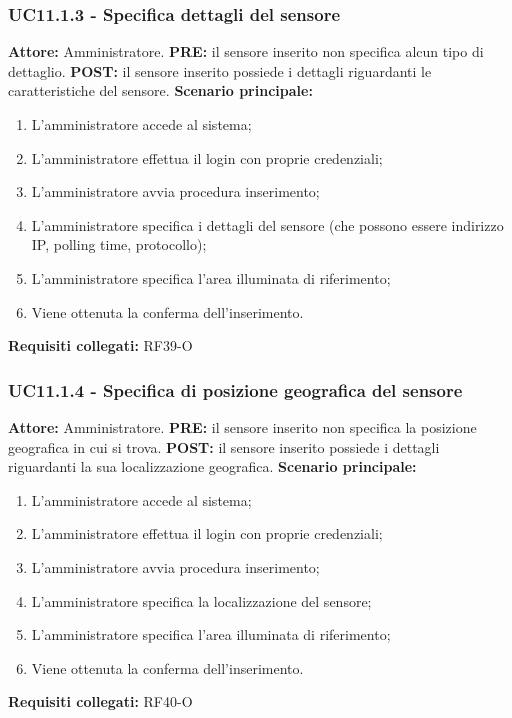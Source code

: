 \documentclass[a4paper, 12pt]{article}
\begin{document}
\subsubsection{UC11.1.3 - Specifica dettagli del sensore}
\textbf{Attore:} Amministratore.\newline
\textbf{PRE:} il sensore inserito non specifica alcun tipo di dettaglio.\newline
\textbf{POST:} il sensore inserito possiede i dettagli riguardanti le caratteristiche del sensore.\newline
\textbf{Scenario principale:}
\begin{enumerate}
    \item L'amministratore accede al sistema;
    \item L'amministratore effettua il login con proprie credenziali;
    \item L'amministratore avvia procedura inserimento;
    \item L'amministratore specifica i dettagli del sensore (che possono essere indirizzo IP, polling time, protocollo);
    \item L'amministratore specifica l'area illuminata di riferimento;
    \item Viene ottenuta la conferma dell'inserimento.
\end{enumerate}
\textbf{Requisiti collegati:} RF39-O\newline

\subsubsection{UC11.1.4 - Specifica di posizione geografica del sensore}
\textbf{Attore:} Amministratore.\newline
\textbf{PRE:} il sensore inserito non specifica la posizione geografica in cui si trova.\newline
\textbf{POST:} il sensore inserito possiede i dettagli riguardanti la sua localizzazione geografica.\newline
\textbf{Scenario principale:}
\begin{enumerate}
    \item L'amministratore accede al sistema;
    \item L'amministratore effettua il login con proprie credenziali;
    \item L'amministratore avvia procedura inserimento;
    \item L'amministratore specifica la localizzazione del sensore;
    \item L'amministratore specifica l'area illuminata di riferimento;
    \item Viene ottenuta la conferma dell'inserimento.
\end{enumerate}
\textbf{Requisiti collegati:} RF40-O\newline
\end{document}
